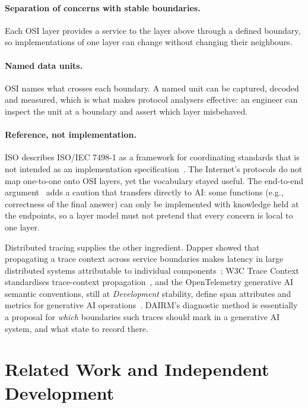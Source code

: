 \documentclass[11pt]{article}
\begin{document}
\paragraph{Separation of concerns with stable boundaries.} Each OSI layer provides a service to the layer above through a defined boundary, so implementations of one layer can change without changing their neighbours.

\paragraph{Named data units.} OSI names what crosses each boundary. A named unit can be captured, decoded and measured, which is what makes protocol analysers effective: an engineer can inspect the unit at a boundary and assert which layer misbehaved.

\paragraph{Reference, not implementation.} ISO describes ISO/IEC 7498-1 as a framework for coordinating standards that is not intended as an implementation specification~\cite{iso7498}. The Internet's protocols do not map one-to-one onto OSI layers, yet the vocabulary stayed useful. The end-to-end argument~\cite{saltzer1984e2e} adds a caution that transfers directly to AI: some functions (e.g., correctness of the final answer) can only be implemented with knowledge held at the endpoints, so a layer model must not pretend that every concern is local to one layer.

Distributed tracing supplies the other ingredient. Dapper showed that propagating a trace context across service boundaries makes latency in large distributed systems attributable to individual components~\cite{sigelman2010dapper}; W3C Trace Context standardises trace-context propagation~\cite{w3ctracecontext}, and the OpenTelemetry generative AI semantic conventions, still at \emph{Development} stability, define span attributes and metrics for generative AI operations~\cite{otelgenai}. DAIRM's diagnostic method is essentially a proposal for \emph{which} boundaries such traces should mark in a generative AI system, and what state to record there.

\section{Related Work and Independent Development}
\label{sec:related}
\end{document}
